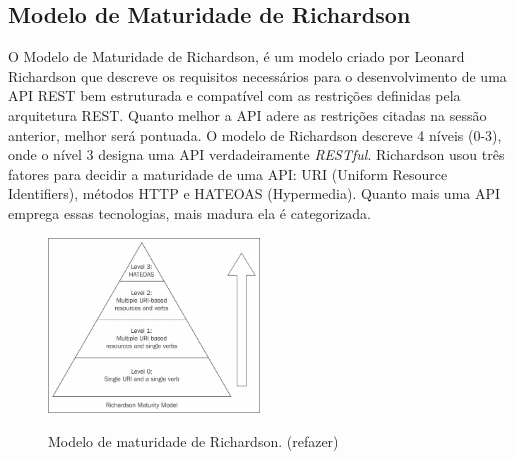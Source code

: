 
\subsection{Modelo de Maturidade de Richardson}



O Modelo de Maturidade de Richardson, é um modelo criado por Leonard Richardson que descreve os requisitos necessários para o desenvolvimento de uma API REST bem estruturada e compatível com as restrições definidas pela arquitetura REST. Quanto melhor a API adere as restrições citadas na sessão anterior, melhor será pontuada. O  modelo de Richardson descreve 4 níveis (0-3), onde o nível 3 designa uma API verdadeiramente \textit{RESTful}. Richardson usou três fatores para decidir a maturidade de uma API: URI (Uniform Resource Identifiers), métodos HTTP e HATEOAS (Hypermedia). Quanto mais uma API emprega essas tecnologias, mais madura ela é categorizada.

\begin{figure}[htbp]
\centering
\includegraphics[width=0.5\textwidth]{figuras/rest-maturity-model.jpg}
\label{fig:rest-maturity-model}
\caption{Modelo de maturidade de Richardson. (refazer)}
\author{}
\end{figure}

